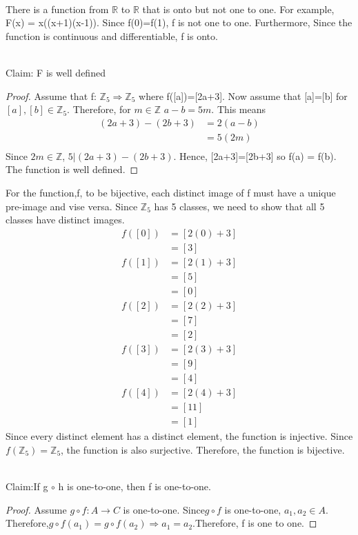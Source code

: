\documentclass[12pt]{article}
\newenvironment{problem}[2][Problem]{\begin{trivlist}
\item[\hskip \labelsep {\bfseries #1}\hskip \labelsep {\bfseries #2.}]}{\end{trivlist}}
\begin{document}
\begin{problem}{9.25}
\text{ }\\
There is a function from $\mathbb{R}$ to $\mathbb{R}$ that is onto but not one to one. For example, F(x) = x((x+1)(x-1)). Since f(0)=f(1), f is not one to one. Furthermore, Since the function is continuous and differentiable, f is onto.  
\end{problem}

\begin{problem}{9.31}
\text{ }\\
Claim: F is well defined
\end{problem}
\begin{proof}
Assume that f: $\mathbb{Z}_5 \Rightarrow \mathbb{Z}_5$ where f([a])=[2a+3]. Now assume that [a]=[b] for $[a],[b]\in\mathbb{Z}_5$. Therefore, for $m\in\mathbb{Z}$ $a-b=5m$. This means
\begin{align}
(2a+3)-(2b+3)&=2(a-b)
\\ \nonumber
&=5(2m)
\\ \nonumber
\end{align}
Since $2m \in \mathbb{Z}$, $ 5|(2a+3)-(2b+3)$. Hence, [2a+3]=[2b+3] so f(a) = f(b). The function is well defined. 
\end{proof}
For the function,f, to be bijective, each distinct image of f must have a unique pre-image and vise versa. Since $\mathbb{Z}_5$ has 5 classes, we need to show that all 5 classes have distinct images. 
\begin{align}
f([0])&=[2(0)+3]
\\ \nonumber
&=[3]
\\ 
f([1])&=[2(1)+3]
\\ \nonumber
&=[5]
\\ \nonumber
&=[0]
\\
f([2])&=[2(2)+3]
\\ \nonumber
&=[7]
\\ \nonumber
&=[2]
\\
f([3])&=[2(3)+3]
\\ \nonumber
&=[9]
\\ \nonumber
&=[4]
\\
f([4])&=[2(4)+3]
\\ \nonumber
&=[11]
\\ \nonumber
&=[1]
\end{align}
Since every distinct element has a distinct element, the function is injective. Since $f(\mathbb{Z}_5)=\mathbb{Z}_5$, the function is also surjective. Therefore, the function is bijective. 
\\
\begin{problem}{9.43}
\text{ }\\
Claim:If g $\circ$ h is one-to-one, then f is one-to-one.
\end{problem}
\begin{proof}
Assume $g \circ f: A \rightarrow C$ is one-to-one. Since$g \circ f$ is one-to-one, $a_1,a_2 \in A$. Therefore,$g \circ f (a_1)=g \circ f (a_2)\Rightarrow a_1 = a_2$.Therefore, f is one to one.
\end{proof}
\end{document}
